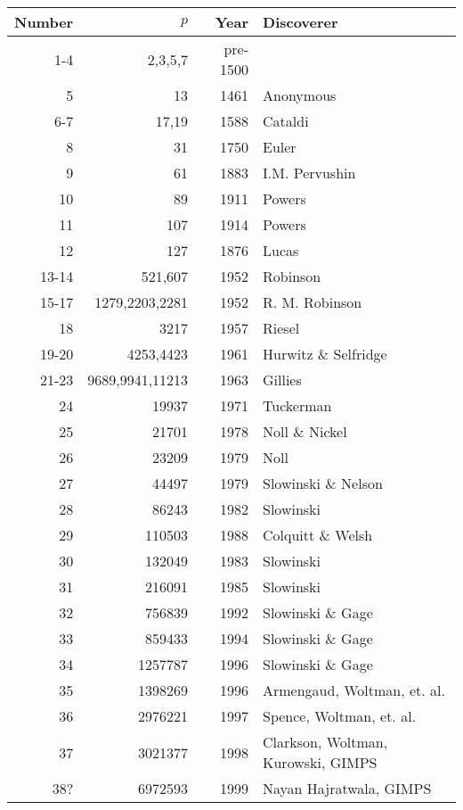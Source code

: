 \bigskip
\bigskip
\hspace{2cm}
\begin{tabular}{|r|r|r|l|} \hline

{Number} & {$p$} & {Year}& {Discoverer} \\ \hline

     1-4 &   2,3,5,7      &             pre-1500 &\\
     5   &      13        &                1461 & Anonymous \\
     6-7 &      17,19        &             1588 & Cataldi\\
     8   &       31          &             1750 & Euler\\
     9   &       61          &             1883 & I.M. Pervushin\\
    10   &       89          &             1911 & Powers\\
    11   &       107         &             1914 & Powers\\
    12   &       127         &             1876 & Lucas\\
    13-14&       521,607     &             1952 & Robinson\\
    15-17&       1279,2203,2281  &         1952 & R. M. Robinson\\
    18   &       3217            &         1957 & Riesel\\
    19-20&       4253,4423       &         1961 & Hurwitz \& Selfridge \\
    21-23&       9689,9941,11213 &         1963 & Gillies\\
    24   &       19937           &         1971 & Tuckerman\\
    25   &       21701           &         1978 & Noll \& Nickel\\
    26   &       23209           &         1979 & Noll\\
    27   &       44497           &         1979 & Slowinski \& Nelson\\
    28   &       86243           &         1982 & Slowinski\\
    29   &       110503          &         1988 & Colquitt \& Welsh\\
    30   &       132049          &         1983 & Slowinski\\
    31   &       216091          &         1985 & Slowinski\\
    32   &       756839          &         1992 & Slowinski \& Gage\\
    33  &       859433          &         1994 & Slowinski \& Gage\\
    34  &      1257787          &         1996 & Slowinski \& Gage \\
    35  &      1398269          &         1996 & Armengaud, Woltman, et. al.\\
    36  &      2976221          &         1997 & Spence, Woltman, et. al.\\
    37 & 	3021377		&		1998 & Clarkson, Woltman, Kurowski, GIMPS \\
    38? & 	6972593		&		1999 & Nayan Hajratwala, GIMPS \\
\hline    
\end{tabular}


